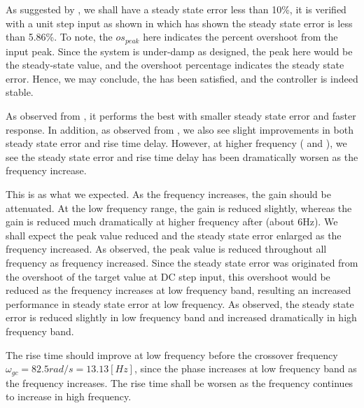\documentclass{tron}
\begin{document}
	\clearpage
	\begin{remark}{}
		As suggested by , we shall have a steady state error less than 10\%, it is verified with a unit step input as shown in  which has shown the steady state error is less than 5.86\%. To note, the $os_{peak}$ here indicates the percent overshoot from the input peak. Since the system is under-damp as designed, the peak here would be the steady-state value, and the overshoot percentage indicates the steady state error. Hence, we may conclude, the  has been satisfied, and the controller is indeed stable.
	\end{remark}
	
	\begin{remark}{}
		As observed from , it performs the best with smaller steady state error and faster response. In addition, as observed from , we also see slight improvements in both steady state error and rise time delay. However, at higher frequency ( and ), we see the steady state error and rise time delay has been dramatically worsen as the frequency increase. 
		
		This is as what we expected. As the frequency increases, the gain should be attenuated. At the low frequency range, the gain is reduced slightly, whereas the gain is reduced much dramatically at higher frequency after (about 6Hz). We shall expect the peak value reduced and the steady state error enlarged as the frequency increased. As observed, the peak value is reduced throughout all frequency as frequency increased. Since the steady state error was originated from the overshoot of the target value at DC step input, this overshoot would be reduced as the frequency increases at low frequency band, resulting an increased performance in steady state error at low frequency. As observed, the steady state error is reduced slightly in low frequency band and increased dramatically in high frequency band. 
	
		The rise time should improve at low frequency before the crossover frequency $\omega_{gc} = 82.5 \unit{rad/s} = 13.13 [Hz]$, since the phase increases at low frequency band as the frequency increases. The rise time shall be worsen as the frequency continues to increase in high frequency. 
	\end{remark}
\end{document}
